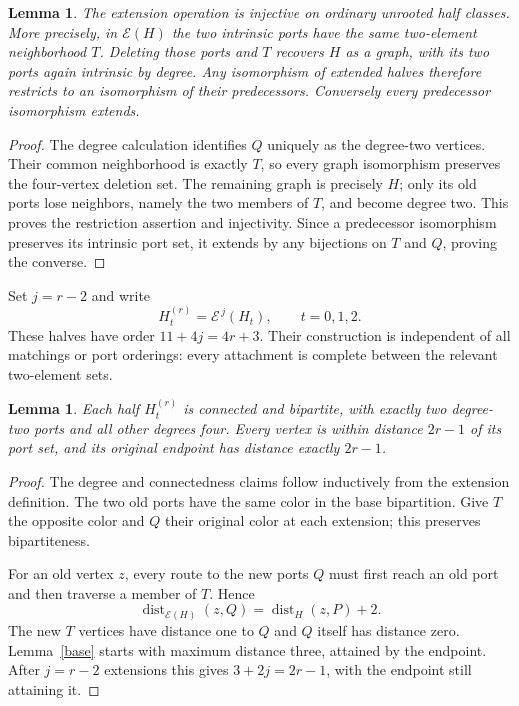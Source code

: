 \documentclass[11pt]{article}
\newtheorem{lemma}[theorem]{Lemma}
\theoremstyle{definition}\newtheorem{definition}[theorem]{Definition}
\newcommand{\dist}{\operatorname{dist}}
\newcommand{\E}{\mathcal E}
\begin{document}
\begin{lemma}\label{peeling}
The extension operation is injective on ordinary unrooted half classes.
More precisely, in $\E(H)$ the two intrinsic ports have the same
two-element neighborhood $T$. Deleting those ports and $T$ recovers
$H$ as a graph, with its two ports again intrinsic by degree.
Any isomorphism of extended halves therefore restricts to an
isomorphism of their predecessors. Conversely every predecessor
isomorphism extends.
\end{lemma}
\begin{proof}
The degree calculation identifies $Q$ uniquely as the degree-two
vertices. Their common neighborhood is exactly $T$, so every graph
isomorphism preserves the four-vertex deletion set. The remaining
graph is precisely $H$; only its old ports lose neighbors, namely
the two members of $T$, and become degree two. This proves the
restriction assertion and injectivity. Since a predecessor
isomorphism preserves its intrinsic port set, it extends by any
bijections on $T$ and $Q$, proving the converse.
\end{proof}

Set $j=r-2$ and write
\[
 H_t^{(r)}=\E^{\,j}(H_t),\qquad t=0,1,2.
\]
These halves have order $11+4j=4r+3$. Their construction is independent
of all matchings or port orderings: every attachment is complete
between the relevant two-element sets.

\begin{lemma}\label{depth}
Each half $H_t^{(r)}$ is connected and bipartite, with exactly two
degree-two ports and all other degrees four. Every vertex is within
distance $2r-1$ of its port set, and its original endpoint has distance
exactly $2r-1$.
\end{lemma}
\begin{proof}
The degree and connectedness claims follow inductively from the
extension definition. The two old ports have the same color in the
base bipartition. Give $T$ the opposite color and $Q$ their original
color at each extension; this preserves bipartiteness.

For an old vertex $z$, every route to the new ports $Q$ must first
reach an old port and then traverse a member of $T$. Hence
\[
 \dist_{\E(H)}(z,Q)=\dist_H(z,P)+2.
\]
The new $T$ vertices have distance one to $Q$ and $Q$ itself has
distance zero. Lemma~\ref{base} starts with maximum distance three,
attained by the endpoint. After $j=r-2$ extensions this gives
$3+2j=2r-1$, with the endpoint still attaining it.
\end{proof}
\end{document}
